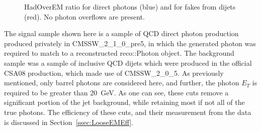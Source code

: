 \documentclass{cmspaper}
\begin{document}
\begin{figure}[hbtp]
  \begin{center}
    \caption{HadOverEM ratio for direct photons (blue) and for fakes from dijets (red).  No photon overflows are present.}
    \label{fig:HadOverEM_EMLoose}
  \end{center}
\end{figure}

The signal sample shown here is a sample of QCD direct photon production produced privately in CMSSW\_2\_1\_0\_pre5, in which the generated photon was required to match to a reconstructed reco::Photon object.  The background sample was a sample of inclusive QCD dijets which were produced in the official CSA08 production, which made use of CMSSW\_2\_0\_5.  As previously mentioned, only barrel photons are considered here, and further, the photon $E_{T}$ is required to be greater than 20~GeV.
As one can see, these cuts remove a significant portion of the jet background, while retaining most if not all of the true photons.  The efficiency of these cuts, and their measurement from the data is discussed in Section~\ref{ssec:LooseEMEff}.
\end{document}
